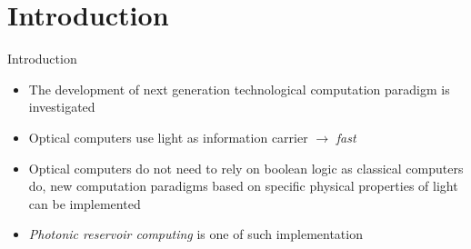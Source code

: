 \section{Introduction}

\begin{frame}{Introduction}
	\begin{itemize}
		\item The development of next generation technological computation paradigm is investigated
		\item Optical computers use light as information carrier $\longrightarrow$ \textit{fast}
		\item Optical computers do not need to rely on boolean logic as classical computers do, new computation paradigms based on specific physical properties of light can be implemented
		\item \textit{Photonic reservoir computing} is one of such implementation
	\end{itemize}
\end{frame}